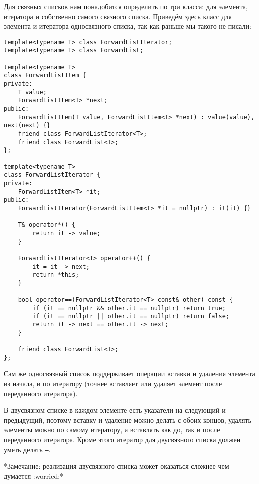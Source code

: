 Для связных списков нам понадобится определить по три класса: для элемента, итератора и собственно самого связного списка. Приведём здесь класс для элемента и итератора односвязного списка, так как раньше мы такого не писали:
\begin{verbatim}
template<typename T> class ForwardListIterator;
template<typename T> class ForwardList;

template<typename T>
class ForwardListItem {
private:
    T value;
    ForwardListItem<T> *next;
public:
    ForwardListItem(T value, ForwardListItem<T> *next) : value(value), next(next) {}
    friend class ForwardListIterator<T>;
    friend class ForwardList<T>;
};

template<typename T>
class ForwardListIterator {
private:
    ForwardListItem<T> *it;
public:
    ForwardListIterator(ForwardListItem<T> *it = nullptr) : it(it) {}

    T& operator*() {
        return it -> value;
    }

    ForwardListIterator<T> operator++() {
        it = it -> next;
        return *this;
    }

    bool operator==(ForwardListIterator<T> const& other) const {
        if (it == nullptr && other.it == nullptr) return true;
        if (it == nullptr || other.it == nullptr) return false;
        return it -> next == other.it -> next;
    }

    friend class ForwardList<T>;
};
\end{verbatim}
Сам же односвязный список поддерживает операции вставки и удаления элемента из начала, и по итератору (точнее вставляет или удаляет элемент после переданного итератора).

В двусвязном списке в каждом элементе есть указатели на следующий и предыдущий, поэтому вставку и удаление можно делать с обоих концов, удалять элементы можно по самому итератору, а вставлять как до, так и после переданного итератора. Кроме этого итератор для двусвязного списка должен уметь делать \texttt{--}.

*Замечание: реализация двусвязного списка может оказаться сложнее чем думается :worried:*
